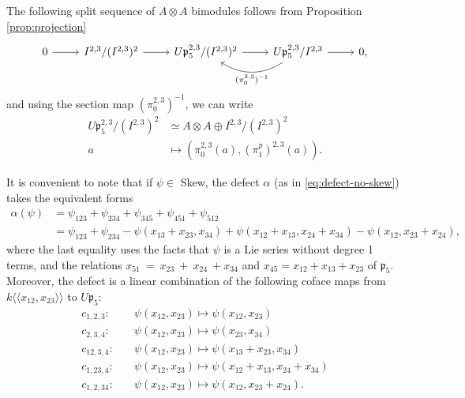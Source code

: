 \documentclass[a4paper,fleqn]{cas-sc}
\begin{document}
The following split sequence of $A\otimes A$ bimodules follows from Proposition \ref{prop:projection}
\begin{equation}\label{eq:exact sequence}
\begin{tikzcd}
    0\arrow{r} & I^{2,3}/(I^{2,3})^2\arrow{r} &U\mathfrak{p}^{2,3}_5/(I^{2,3})^2\arrow{r} &  U\mathfrak{p}^{2,3}_5/I^{2,3}\arrow{r}\arrow[bend left=33]{l}{(\pi^{2,3}_0)^{-1}} & 0,
\end{tikzcd}
\end{equation}
and using the section map $(\pi^{2,3}_{0})^{-1}$, we can write 
\begin{equation*}
\begin{split}
	U\mathfrak{p}^{2,3}_5/(I^{2,3})^2  & \simeq A\otimes A\oplus I^{2,3}/(I^{2,3})^2 \\
    a  & \mapsto (\pi^{2,3}_0(a),(\pi_1^p)^{2,3}(a)).
\end{split}
\end{equation*}

It is convenient to note that if $\psi \in$ %
Skew, the defect $\alpha$ (as in \eqref{eq:defect-no-skew}) takes the equivalent forms
\begin{align}
\alpha(\psi) & =\psi_{123}+\psi_{234}+\psi_{345}+\psi_{451}+\psi_{512} \nonumber \\
& \label{eq:defect-skew-2}
=\psi_{123}+\psi_{234}-\psi(x_{13}+x_{23},x_{34}) +\psi(x_{12}+x_{13},x_{24}+x_{34})-\psi(x_{12},x_{23}+x_{24}),
\end{align}
where the last equality uses the facts that $\psi$ is a Lie series without degree 1 terms, and the relations 
    $x_{51}~=~x_{23}~+~x_{24}~+x_{34}$ and $x_{45} = x_{12} + x_{13} + x_{23}$ of $\mathfrak{p}_5$.
Moreover, the defect is a linear combination of the following coface maps from $k\langle\langle x_{12},x_{23}\rangle\rangle$ to $U\mathfrak{p}_5$:
\begin{equation}
\label{eq:coface-maps-1}
\begin{split}
c_{1,2,3}:\quad&\psi(x_{12},x_{23})\mapsto \psi(x_{12},x_{23})\\
c_{2,3,4}:\quad&\psi(x_{12},x_{23})\mapsto \psi(x_{23},x_{34})\\
c_{12,3,4}:\quad&\psi(x_{12},x_{23})\mapsto \psi(x_{13}+x_{23},x_{34})\\
c_{1,23,4}:\quad&\psi(x_{12},x_{23})\mapsto \psi(x_{12}+x_{13},x_{24}+x_{34})\\
c_{1,2,34}:\quad&\psi(x_{12},x_{23})\mapsto \psi(x_{12},x_{23}+x_{24}).
\end{split}
\end{equation}
\end{document}
